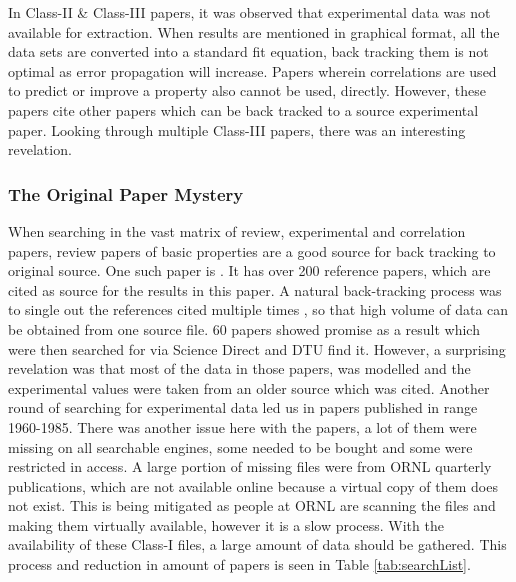 In Class-II \& Class-III papers, it was observed that experimental data was not available for extraction. When results are mentioned in graphical format, all the data sets are converted into a standard fit equation, back tracking them is not optimal as error propagation will increase. Papers wherein correlations are used to predict or improve a property also cannot be used, directly. However, these papers cite other papers which can be back tracked to a source experimental paper. Looking through multiple Class-III papers, there was an interesting revelation.

\subsubsection{ The Original Paper Mystery }

When searching in the vast matrix of review, experimental and correlation papers, review papers of basic properties are a good source for back tracking to original source. One such paper is \cite{serrano-2013a}. It has over 200 reference papers, which are cited as source for the results in this paper. A natural back-tracking process was to single out the references cited multiple times , so that high volume of data can be obtained from one source file. 60 papers showed promise as a result which were then searched for via Science Direct and DTU find it. However, a surprising revelation was that most of the data in those papers, was modelled and the experimental values were taken from an older source which was cited. Another round of searching for experimental data led us in papers published in range 1960-1985. There was another issue here with the papers, a lot of them were missing on all searchable engines, some needed to be bought and some were restricted in access. A large portion of missing files were from ORNL quarterly publications, which are not available online because a virtual copy of them does not exist. This is being mitigated as people at ORNL are scanning the files and making them virtually available, however it is a slow process. With the availability of these Class-I files, a large amount of data should be gathered. This process and reduction in amount of papers is seen in Table \ref{tab:searchList}.

